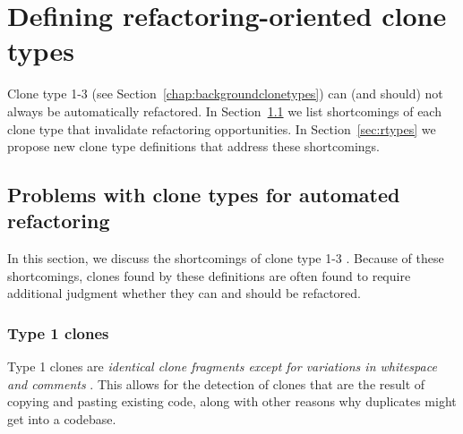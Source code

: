 \chapter{Defining refactoring-oriented clone types}\label{chap:clonetypes}
Clone type 1-3 (see Section~\ref{chap:backgroundclonetypes}) can (and should) not always be automatically refactored. In Section~\ref{sec:literaturetypeproblems} we list shortcomings of each clone type that invalidate refactoring opportunities. In Section~\ref{sec:rtypes} we propose new clone type definitions that address these shortcomings.


\section{Problems with clone types for automated refactoring}\label{sec:literaturetypeproblems}

In this section, we discuss the shortcomings of clone type 1-3 \cite{roy2007survey}. Because of these shortcomings, clones found by these definitions are often found to require additional judgment whether they can and should be refactored.

\subsection{Type 1 clones}\label{sec:type1}
Type 1 clones are \textit{identical clone fragments except for variations in whitespace and comments} \cite{roy2007survey}. This allows for the detection of clones that are the result of copying and pasting existing code, along with other reasons why duplicates might get into a codebase.

